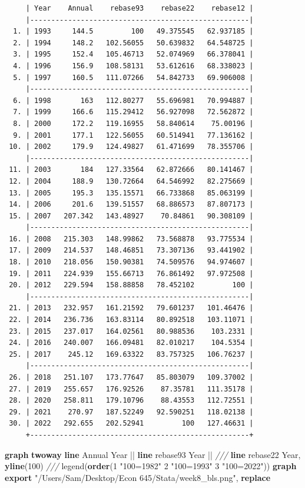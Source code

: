 \documentclass[
]{book}
\newenvironment{Shaded}{\begin{snugshade}}{\end{snugshade}}
\newcommand{\BaseNTok}[1]{\textcolor[rgb]{0.00,0.00,0.81}{#1}}
\newcommand{\CommentTok}[1]{\textcolor[rgb]{0.56,0.35,0.01}{\textit{#1}}}
\newcommand{\KeywordTok}[1]{\textcolor[rgb]{0.13,0.29,0.53}{\textbf{#1}}}
\newcommand{\NormalTok}[1]{#1}
\newcommand{\StringTok}[1]{\textcolor[rgb]{0.31,0.60,0.02}{#1}}
\begin{document}
\begin{verbatim}
     | Year    Annual    rebase93    rebase22    rebase12 |
     |----------------------------------------------------|
  1. | 1993     144.5         100   49.375545   62.937185 |
  2. | 1994     148.2   102.56055   50.639832   64.548725 |
  3. | 1995     152.4   105.46713   52.074969   66.378041 |
  4. | 1996     156.9   108.58131   53.612616   68.338023 |
  5. | 1997     160.5   111.07266   54.842733   69.906008 |
     |----------------------------------------------------|
  6. | 1998       163   112.80277   55.696981   70.994887 |
  7. | 1999     166.6   115.29412   56.927098   72.562872 |
  8. | 2000     172.2   119.16955   58.840614    75.00196 |
  9. | 2001     177.1   122.56055   60.514941   77.136162 |
 10. | 2002     179.9   124.49827   61.471699   78.355706 |
     |----------------------------------------------------|
 11. | 2003       184   127.33564   62.872666   80.141467 |
 12. | 2004     188.9   130.72664   64.546992   82.275669 |
 13. | 2005     195.3   135.15571   66.733868   85.063199 |
 14. | 2006     201.6   139.51557   68.886573   87.807173 |
 15. | 2007   207.342   143.48927    70.84861   90.308109 |
     |----------------------------------------------------|
 16. | 2008   215.303   148.99862   73.568878   93.775534 |
 17. | 2009   214.537   148.46851   73.307136   93.441902 |
 18. | 2010   218.056   150.90381   74.509576   94.974607 |
 19. | 2011   224.939   155.66713   76.861492   97.972508 |
 20. | 2012   229.594   158.88858   78.452102         100 |
     |----------------------------------------------------|
 21. | 2013   232.957   161.21592   79.601237   101.46476 |
 22. | 2014   236.736   163.83114   80.892518   103.11071 |
 23. | 2015   237.017   164.02561   80.988536    103.2331 |
 24. | 2016   240.007   166.09481   82.010217    104.5354 |
 25. | 2017    245.12   169.63322   83.757325   106.76237 |
     |----------------------------------------------------|
 26. | 2018   251.107   173.77647   85.803079   109.37002 |
 27. | 2019   255.657   176.92526    87.35781   111.35178 |
 28. | 2020   258.811   179.10796    88.43553   112.72551 |
 29. | 2021    270.97   187.52249   92.590251   118.02138 |
 30. | 2022   292.655   202.52941         100   127.46631 |
     +----------------------------------------------------+
\end{verbatim}

\begin{Shaded}
\begin{Highlighting}[]
\KeywordTok{graph} \KeywordTok{twoway} \KeywordTok{line}\NormalTok{ Annual Year || }\KeywordTok{line}\NormalTok{ rebase93 Year || }\CommentTok{///}
    \KeywordTok{line}\NormalTok{ rebase22 Year, }\KeywordTok{yline}\NormalTok{(100) }\CommentTok{///}
    \BaseNTok{legend}\NormalTok{(}\KeywordTok{order}\NormalTok{(1 }\StringTok{"100=1982"}\NormalTok{ 2 }\StringTok{"100=1993"}\NormalTok{ 3 }\StringTok{"100=2022"}\NormalTok{))}
\KeywordTok{graph} \KeywordTok{export} \StringTok{"/Users/Sam/Desktop/Econ 645/Stata/week8\_bls.png"}\NormalTok{, }\KeywordTok{replace}
\end{Highlighting}
\end{Shaded}
\end{document}
